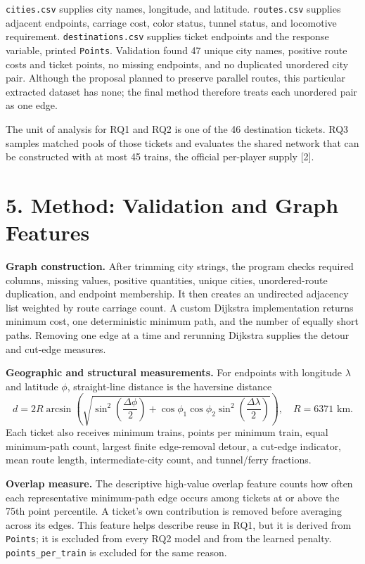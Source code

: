 \documentclass[11pt]{article}
\newcommand{\code}[1]{\texttt{#1}}
\begin{document}
\code{cities.csv} supplies city names, longitude, and latitude.
\code{routes.csv} supplies adjacent endpoints, carriage cost, color status,
tunnel status, and locomotive requirement. \code{destinations.csv} supplies
ticket endpoints and the response variable, printed \code{Points}. Validation
found 47 unique city names, positive route costs and ticket points, no missing
endpoints, and no duplicated unordered city pair. Although the proposal
planned to preserve parallel routes, this particular extracted dataset has
none; the final method therefore treats each unordered pair as one edge.

The unit of analysis for RQ1 and RQ2 is one of the 46 destination tickets.
RQ3 samples matched pools of those tickets and evaluates the shared network
that can be constructed with at most 45 trains, the official per-player
supply [2].

\newpage
\section*{5. Method: Validation and Graph Features}

\textbf{Graph construction.} After trimming city strings, the program checks
required columns, missing values, positive quantities, unique cities,
unordered-route duplication, and endpoint membership. It then creates an
undirected adjacency list weighted by route carriage count. A custom
Dijkstra implementation returns minimum cost, one deterministic minimum
path, and the number of equally short paths. Removing one edge at a time and
rerunning Dijkstra supplies the detour and cut-edge measures.

\textbf{Geographic and structural measurements.} For endpoints with
longitude $\lambda$ and latitude $\phi$, straight-line distance is the
haversine distance
\[
d=2R\arcsin\!\left(\sqrt{\sin^2\!\left(\frac{\Delta\phi}{2}\right)+
\cos\phi_1\cos\phi_2\sin^2\!\left(\frac{\Delta\lambda}{2}\right)}\right),
\quad R=6371\text{ km}.
\]
Each ticket also receives minimum trains, points per minimum train, equal
minimum-path count, largest finite edge-removal detour, a cut-edge indicator,
mean route length, intermediate-city count, and tunnel/ferry fractions.

\textbf{Overlap measure.} The descriptive high-value overlap feature counts
how often each representative minimum-path edge occurs among tickets at or
above the 75th point percentile. A ticket's own contribution is removed
before averaging across its edges. This feature helps describe reuse in RQ1,
but it is derived from \code{Points}; it is excluded from every RQ2 model and
from the learned penalty. \code{points\_per\_train} is excluded for the same
reason.
\end{document}
